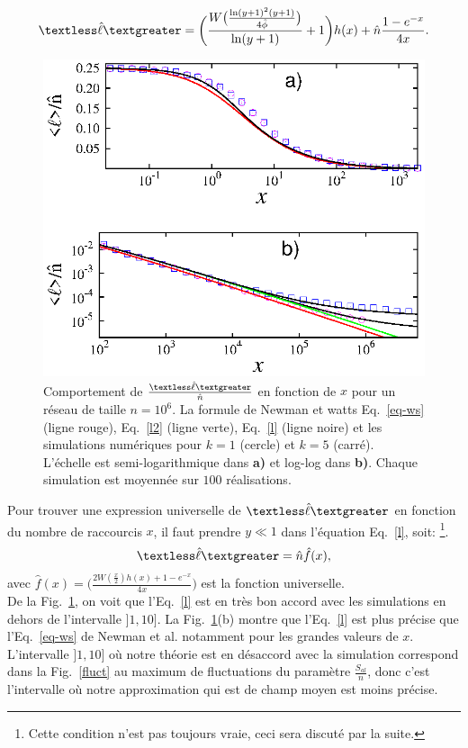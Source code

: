 \begin{equation}
\textless \hat{\ell} \textgreater=\bigg(\frac{W\big(\frac{\ln(y+1)^2(y+1)}{4\hat{\phi}}\big)}{\ln(y+1)}+1\bigg)h(x)+\hat{n}\frac{1-e^{-x}}{4x}.
\label{l}
\end{equation}
\begin{figure}[h!]
	\centering
	\includegraphics[scale=1.25,angle=0]{./figures/kpn}
	\caption{Comportement de  $\frac{\textless \hat{\ell} \textgreater}{\hat{n}}$ en fonction de $x$ pour un réseau de taille $n=10^6$. La formule de Newman et watts Eq.~\eqref{eq-ws} (ligne rouge), Eq.~\eqref{l2} (ligne verte), Eq.~\eqref{l} (ligne noire) et les simulations numériques pour $k=1$ (cercle) et $k=5$ (carré). L'échelle est semi-logarithmique dans \textbf{a)} et log-log dans \textbf{b)}. Chaque simulation est moyennée sur $100$ réalisations.}
	\label{chemin}
\end{figure}
Pour trouver une expression universelle de $\textless \hat{\ell} \textgreater$ en fonction du nombre de raccourcis $x$, il faut prendre $y\ll 1$ dans l'équation Eq.~\eqref{l},  soit: \footnote{Cette condition n'est pas toujours vraie, ceci sera discuté par la suite.}.
\begin{eqnarray}
\textless \hat{\ell} \textgreater=\hat{n}\hat{f}(x), 
\label{l2}
\end{eqnarray}
avec $\hat{f}(x)=\big(\frac{2W(\frac{x}{2})h(x)+1-e^{-x}}{4x}\big)$ est la fonction universelle.\\
De la Fig.~\ref{chemin}, on voit que l'Eq.~\eqref{l} est en très bon accord avec les simulations en dehors de l'intervalle $]1,10]$. La Fig.~\ref{chemin}(b) montre que l'Eq.~\eqref{l} est plus précise que l'Eq.~\eqref{eq-ws} de Newman et al. notamment pour les grandes valeurs de $x$. L'intervalle $]1,10]$ où notre théorie est en désaccord avec la simulation correspond dans la Fig.~\ref{fluct} au maximum de fluctuations du paramètre $\frac{S_{al}}{n}$, donc c'est l'intervalle où notre approximation qui est de champ moyen est moins précise.

